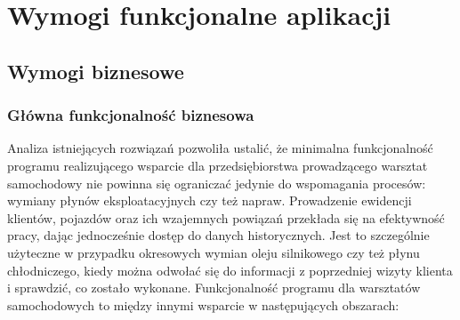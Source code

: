 \chapter{Wymogi funkcjonalne aplikacji}
\label{chapter:app_functional_requirements}
	\section{Wymogi biznesowe}
	
		\subsection{Główna funkcjonalność biznesowa}
			Analiza istniejących rozwiązań pozwoliła ustalić, że minimalna funkcjonalność programu realizującego wsparcie dla przedsiębiorstwa prowadzącego warsztat samochodowy nie powinna się ograniczać jedynie do wspomagania procesów: wymiany płynów eksploatacyjnych czy też napraw. Prowadzenie ewidencji klientów, pojazdów oraz ich wzajemnych powiązań przekłada się na efektywność pracy, dając jednocześnie dostęp do danych historycznych. Jest to szczególnie użyteczne w przypadku okresowych wymian oleju silnikowego czy też płynu chłodniczego, kiedy można odwołać się do informacji z poprzedniej wizyty klienta i sprawdzić, co zostało wykonane. Funkcjonalność programu dla warsztatów samochodowych to między innymi wsparcie w następujących obszarach:
